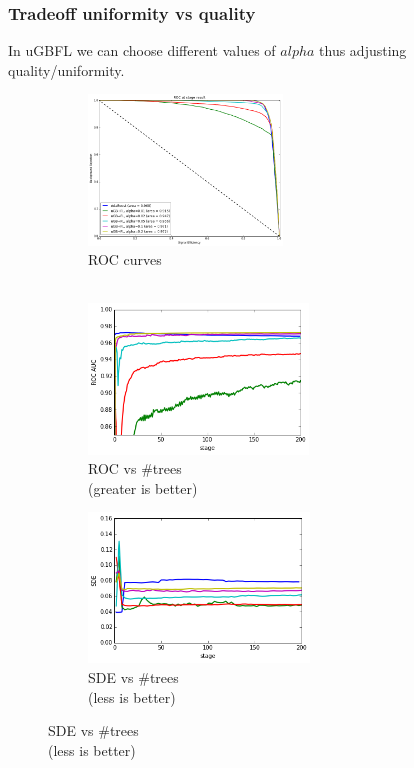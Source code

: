 \documentclass{beamer}
\begin{document}
\begin{frame}[t]
    \frametitle{Tradeoff uniformity vs quality}
    In uGBFL we can choose different values of $alpha$ thus adjusting quality/uniformity.

    \begin{figure}
        \centering
        \begin{subfigure}[b]{0.32\textwidth}
            \includegraphics[width=\textwidth, height=4cm]{img/trade_roc.png}
            \caption{ROC curves \\  
            \; $ \;$
            }
        \end{subfigure}
        \begin{subfigure}[b]{0.32\textwidth}
            \includegraphics[width=\textwidth, height=4cm]{img/trade_roc_stage.png}
            \caption{ROC vs \#trees \\ 
             \; (greater is better)}
        \end{subfigure}
        \begin{subfigure}[b]{0.32\textwidth}
            \includegraphics[width=\textwidth, height=4cm]{img/trade_sde.png}
            \caption{SDE vs \#trees \\ 
              \;  (less is better)
            }
        \end{subfigure}
    \end{figure}



\end{frame}
\end{document}
